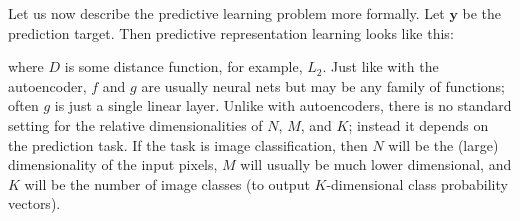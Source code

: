Let us now describe the predictive learning problem more formally. Let $\mathbf{y}$ be the prediction target. Then predictive representation learning looks like this:
\begin{center}
\end{center}
where $D$ is some distance function, for example, $L_2$. Just like with the autoencoder, $f$ and $g$ are usually neural nets but may be any family of functions; often $g$ is just a single linear layer. Unlike with autoencoders, there is no standard setting for the relative dimensionalities of $N$, $M$, and $K$; instead it depends on the prediction task. If the task is image classification, then $N$ will be the (large) dimensionality of the input pixels, $M$ will usually be much lower dimensional, and $K$ will be the number of image classes (to output $K$-dimensional class probability vectors).

